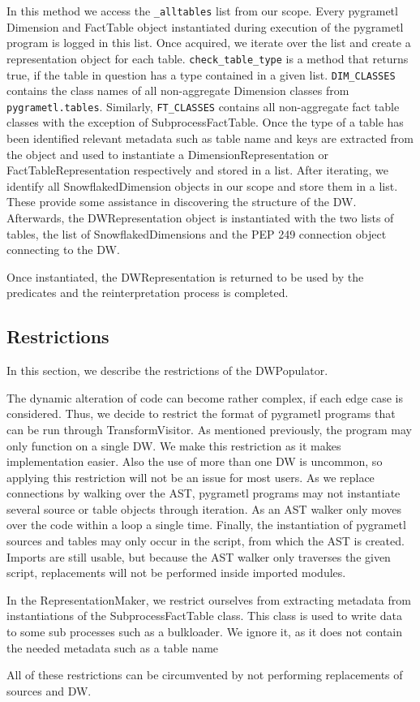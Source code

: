 In this method we access the \texttt{\_alltables} list from our scope. Every pygrametl Dimension and FactTable object instantiated during execution of the pygrametl program is logged in this list. Once acquired, we iterate over the list and create a representation object for each table. \texttt{check\_table\_type} is a method that returns true, if the table in question has a type contained in a given list. \texttt{DIM\_CLASSES} contains the class names of all non-aggregate Dimension classes from \texttt{pygrametl.tables}. Similarly, \texttt{FT\_CLASSES} contains all non-aggregate fact table classes with the exception of SubprocessFactTable. Once the type of a table has been identified relevant metadata such as table name and keys are extracted from the object and used to instantiate a DimensionRepresentation or FactTableRepresentation respectively and stored in a list. After iterating, we identify all SnowflakedDimension objects in our scope and store them in a list. These provide some assistance in discovering the structure of the DW. Afterwards, the DWRepresentation object is instantiated with the two lists of tables, the list of SnowflakedDimensions and the PEP 249 connection object connecting to the DW.

Once instantiated, the DWRepresentation is returned to be used by the predicates and the reinterpretation process is completed.

\subsection{Restrictions}
In this section, we describe the restrictions of the DWPopulator.

The dynamic alteration of code can become rather complex, if each edge case is considered. Thus, we decide to restrict the format of pygrametl programs that can be run through TransformVisitor. As mentioned previously, the program may only function on a single DW. We make this restriction as it makes implementation easier. Also the use of more than one DW is uncommon, so applying this restriction will not be an issue for most users. As we replace connections by walking over the AST, pygrametl programs may not instantiate several source or table objects through iteration. As an AST walker only moves over the code within a loop a single time. Finally, the instantiation of pygrametl sources and tables may only occur in the script, from which the AST is created. Imports are still usable, but because the AST walker only traverses the given script, replacements will not be performed inside imported modules.

In the RepresentationMaker, we restrict ourselves from extracting metadata from instantiations of the SubprocessFactTable class. This class is used to write data to some sub processes such as a bulkloader. We ignore it, as it does not contain the needed metadata such as a table name

 All of these restrictions can be circumvented by not performing replacements of sources and DW.


